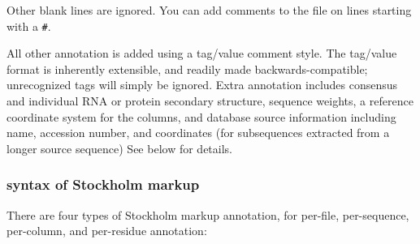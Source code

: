 Other blank lines are ignored. You can add comments to the file on
lines starting with a \verb+#+.

All other annotation is added using a tag/value comment style. The
tag/value format is inherently extensible, and readily made
backwards-compatible; unrecognized tags will simply be ignored. Extra
annotation includes consensus and individual RNA or protein secondary
structure, sequence weights, a reference coordinate system for the
columns, and database source information including name, accession
number, and coordinates (for subsequences extracted from a longer
source sequence) See below for details.

\subsubsection{syntax of Stockholm markup}

There are four types of Stockholm markup annotation, for per-file,
per-sequence, per-column, and per-residue annotation:

